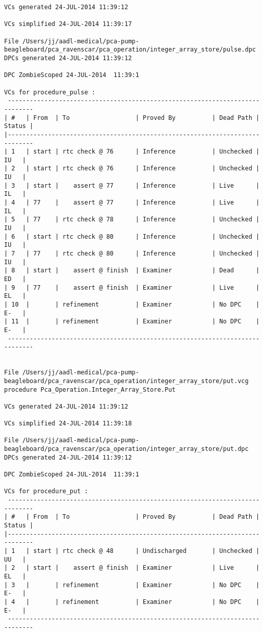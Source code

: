 \begin{lstlisting}[frame=single, gobble=0, caption={POGS report for PCA Pump prototype}]
VCs generated 24-JUL-2014 11:39:12

VCs simplified 24-JUL-2014 11:39:17

File /Users/jj/aadl-medical/pca-pump-beagleboard/pca_ravenscar/pca_operation/integer_array_store/pulse.dpc
DPCs generated 24-JUL-2014 11:39:12

DPC ZombieScoped 24-JUL-2014  11:39:1

VCs for procedure_pulse :
 -----------------------------------------------------------------------------
| #   | From  | To                  | Proved By          | Dead Path | Status |
|-----------------------------------------------------------------------------
| 1   | start | rtc check @ 76      | Inference          | Unchecked |   IU   |
| 2   | start | rtc check @ 76      | Inference          | Unchecked |   IU   |
| 3   | start |    assert @ 77      | Inference          | Live      |   IL   |
| 4   | 77    |    assert @ 77      | Inference          | Live      |   IL   |
| 5   | 77    | rtc check @ 78      | Inference          | Unchecked |   IU   |
| 6   | start | rtc check @ 80      | Inference          | Unchecked |   IU   |
| 7   | 77    | rtc check @ 80      | Inference          | Unchecked |   IU   |
| 8   | start |    assert @ finish  | Examiner           | Dead      |   ED   |
| 9   | 77    |    assert @ finish  | Examiner           | Live      |   EL   |
| 10  |       | refinement          | Examiner           | No DPC    |   E-   |
| 11  |       | refinement          | Examiner           | No DPC    |   E-   |
 -----------------------------------------------------------------------------


File /Users/jj/aadl-medical/pca-pump-beagleboard/pca_ravenscar/pca_operation/integer_array_store/put.vcg
procedure Pca_Operation.Integer_Array_Store.Put

VCs generated 24-JUL-2014 11:39:12

VCs simplified 24-JUL-2014 11:39:18

File /Users/jj/aadl-medical/pca-pump-beagleboard/pca_ravenscar/pca_operation/integer_array_store/put.dpc
DPCs generated 24-JUL-2014 11:39:12

DPC ZombieScoped 24-JUL-2014  11:39:1

VCs for procedure_put :
 -----------------------------------------------------------------------------
| #   | From  | To                  | Proved By          | Dead Path | Status |
|-----------------------------------------------------------------------------
| 1   | start | rtc check @ 48      | Undischarged       | Unchecked |   UU   |
| 2   | start |    assert @ finish  | Examiner           | Live      |   EL   |
| 3   |       | refinement          | Examiner           | No DPC    |   E-   |
| 4   |       | refinement          | Examiner           | No DPC    |   E-   |
 -----------------------------------------------------------------------------



\end{lstlisting}
